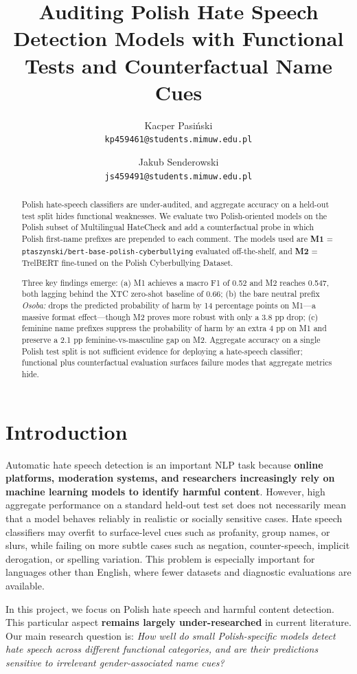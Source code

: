 \documentclass[11pt,a4paper]{article}
\title{Auditing Polish Hate Speech Detection Models with Functional Tests and Counterfactual Name Cues}
\author{
    Kacper Pasi\'nski \\ \texttt{kp459461@students.mimuw.edu.pl}
    \and
    Jakub Senderowski \\ \texttt{js459491@students.mimuw.edu.pl}
}
\date{}
\begin{document}
\maketitle

\begin{abstract}
\noindent
Polish hate-speech classifiers are under-audited, and aggregate accuracy on a held-out test split hides functional weaknesses. We evaluate two Polish-oriented models on the Polish subset of Multilingual HateCheck and add a counterfactual probe in which Polish first-name prefixes are prepended to each comment. The models used are \textbf{M1} = \texttt{ptaszynski/bert-base-polish-cyberbullying} evaluated off-the-shelf, and \textbf{M2} = TrelBERT fine-tuned on the Polish Cyberbullying Dataset. 

Three key findings emerge: (a) M1 achieves a macro F1 of 0.52 and M2 reaches 0.547, both lagging behind the XTC zero-shot baseline of 0.66; (b) the bare neutral prefix \textit{Osoba:} drops the predicted probability of harm by 14 percentage points on M1—a massive format effect—though M2 proves more robust with only a 3.8 pp drop; (c) feminine name prefixes suppress the probability of harm by an extra 4 pp on M1 and preserve a 2.1 pp feminine-vs-masculine gap on M2. Aggregate accuracy on a single Polish test split is not sufficient evidence for deploying a hate-speech classifier; functional plus counterfactual evaluation surfaces failure modes that aggregate metrics hide.
\end{abstract}

\section{Introduction}

Automatic hate speech detection is an important NLP task because \textbf{online platforms, moderation systems, and researchers increasingly rely on machine learning models to identify harmful content}. However, high aggregate performance on a standard held-out test set does not necessarily mean that a model behaves reliably in realistic or socially sensitive cases. Hate speech classifiers may overfit to surface-level cues such as profanity, group names, or slurs, while failing on more subtle cases such as negation, counter-speech, implicit derogation, or spelling variation. This problem is especially important for languages other than English, where fewer datasets and diagnostic evaluations are available.

In this project, we focus on Polish hate speech and harmful content detection. This particular aspect \textbf{remains largely under-researched} in current literature. Our main research question is: \textit{How well do small Polish-specific models detect hate speech across different functional categories, and are their predictions sensitive to irrelevant gender-associated name cues?}
\end{document}
